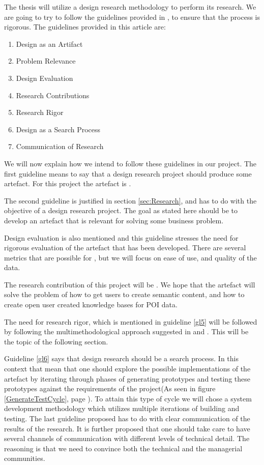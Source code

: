 The thesis will utilize a design research methodology to perform its research. 
We are going to try to follow the guidelines provided in \citet{Hevner2004}, to ensure that the process is rigorous.
The guidelines provided in this article are:
\begin{enumerate}
    \item \label{gl1}Design as an Artifact
    \item \label{gl2}Problem Relevance
    \item \label{gl3}Design Evaluation
    \item \label{gl4}Research Contributions
    \item \label{gl5}Research Rigor
    \item \label{gl6}Design as a Search Process
    \item \label{gl7}Communication of Research
\end{enumerate}

We will now explain how we intend to follow these guidelines in our project.
The first guideline means to say that a design research project should produce some artefact. For this project the artefact is \theartefact. 

The second guideline is justified in section \ref{sec:Research}, and has to do with the objective of a design research project. 
The goal as stated here should be to develop an artefact that is relevant for solving some business problem.

Design evaluation is also mentioned and this guideline stresses the need for rigorous evaluation of the artefact that has been developed.
There are several metrics that are possible for \theartefact, but we will focus on ease of use, and quality of the data.

The research contribution of this project will be \theartefact. 
We hope that the artefact will solve the problem of how to get users to create semantic content, and how to create open user created knowledge bases for POI data.

The need for research rigor, which is mentioned in guideline \ref{gl5} will be followed by following the multimethodological approach suggested in \citet{Chen1990} and \citet{NunamakerJr1990}. 
This will be the topic of the following section.

Guideline \ref{gl6} says that design research should be a search process. 
In this context that mean that one should explore the possible implementations of the artefact by iterating through phases of generating prototypes and testing these prototypes against the requirements of the project(As seen in figure \ref{GenerateTestCycle}, page \pageref{GenerateTestCycle}).
To attain this type of cycle we will chose a system development methodology which utilizes multiple iterations of building and testing.
The last guideline proposed has to do with clear communication of the results of the research. 
It is further proposed that one should take care to have several channels of communication with different levels of technical detail.
The reasoning is that we need to convince both the technical and the managerial communities. 

